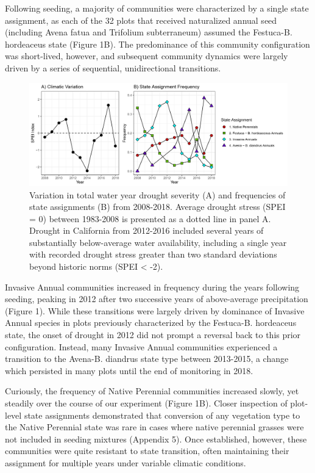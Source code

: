 \documentclass[twoside,12pt,final]{ucthesis-CA2012}
\begin{document}
\begin{ucmainmatter}
Following seeding, a majority of communities were characterized by a single state assignment, as each of the 32 plots that received naturalized annual seed (including Avena fatua and Trifolium subterraneum) assumed the Festuca-B. hordeaceus state (Figure 1B).
The predominance of this community configuration was short-lived, however, and subsequent community dynamics were largely driven by a series of sequential, unidirectional transitions.
\begin{figure}
\centering
\includegraphics[width=\textwidth,height=0.3\textheight]{figure/Fig3_1.png}
\caption{Variation in total water year drought severity (A) and frequencies of state assignments (B) from 2008-2018. Average drought stress (SPEI = 0) between 1983-2008 is presented as a dotted line in panel A. Drought in California from 2012-2016 included several years of substantially below-average water availability, including a single year with recorded drought stress greater than two standard deviations beyond historic norms (SPEI \textless{} -2). \label{fig-3-1}}
\end{figure}
Invasive Annual communities increased in frequency during the years following seeding, peaking in 2012 after two successive years of above-average precipitation (Figure 1).
While these transitions were largely driven by dominance of Invasive Annual species in plots previously characterized by the Festuca-B. hordeaceus state, the onset of drought in 2012 did not prompt a reversal back to this prior configuration.
Instead, many Invasive Annual communities experienced a transition to the Avena-B. diandrus state type between 2013-2015, a change which persisted in many plots until the end of monitoring in 2018.

Curiously, the frequency of Native Perennial communities increased slowly, yet steadily over the course of our experiment (Figure 1B).
Closer inspection of plot-level state assignments demonstrated that conversion of any vegetation type to the Native Perennial state was rare in cases where native perennial grasses were not included in seeding mixtures (Appendix 5).
Once established, however, these communities were quite resistant to state transition, often maintaining their assignment for multiple years under variable climatic conditions.


\end{ucmainmatter}
\end{document}
